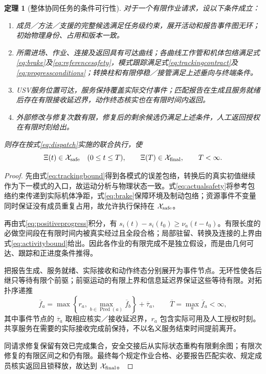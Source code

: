 \documentclass[UTF8,fontset=fandol,a4paper,11pt]{ctexart}
\newtheorem{theorem}{定理}
\newcommand{\Pred}{\operatorname{Pred}}
\begin{document}
\begin{theorem}[整体协同任务的条件可行性]
对于一个有限作业请求，设以下条件成立：
\begin{enumerate}[label=（\arabic*）]
 \item 成员／方法／支援的完整候选满足任务级约束，展开活动和报告事件图无环；初始物理身份、占用和版本一致。
 \item 所需进场、作业、连接及返回具有可达曲线；各曲线工作管和机体包络满足式\eqref{eq:brake}及\eqref{eq:referencesafety}，模式跟踪满足式\eqref{eq:trackingcontract}及\eqref{eq:progressconditions}；转换柱和有限停稳／接管满足上述垂向与终端条件。
 \item USV服务位置可达，服务保持覆盖实际交付事件；匹配报告在生成且服务就绪后存在有限接收延迟界，动作终态核实也在有限时间内返回。
 \item 外部修改与修复次数有限，修复后的剩余候选仍满足上述条件，人工返回授权在有限时刻给出。
\end{enumerate}
则存在按式\eqref{eq:dispatch}实施的联合执行，使
\begin{equation}
 \Xi(t)\in\mathcal X_{\rm safe}\quad(0\leq t\leq T),\qquad
 \Xi(T)\in\mathcal X_{\rm final},\qquad T<\infty.
 \label{eq:wholefeasibility}
\end{equation}
\end{theorem}
\begin{proof}
先由式\eqref{eq:trackingbound}得到各模式的误差包络，转换后的真实初值继续作为下一模式的入口，故运动分析与物理状态一致。式\eqref{eq:actualsafety}将参考包络约束传递到实际机体净距，式\eqref{eq:brake}保障环境及制动包络；资源事件不变量同时保证没有成员重复占用，故允许执行保持在 $\mathcal X_{\rm safe}$。

再由式\eqref{eq:positiveprogress}积分，有 $s_i(t)-s_i(t_0)\geq\nu_a(t-t_0)$。有限长度的必做空间段在有限时间内被真实经过且全段合格；局部驻留、转换及连接的上界由式\eqref{eq:activitybound}给出。因此各作业的有限完成不是独立假设，而是由几何可达、跟踪和正进度条件推得。

把报告生成、服务就绪、实际接收和动作终态分别展开为事件节点。无环性使各后继只等待有限个前驱；前驱运动的有限上界和信息延迟界保证这些等待有限。对拓扑序递推
\begin{equation}
 \overline f_a=
 \max\left\{r_a,\max_{b\in\Pred(a)}\overline f_b\right\}
          +\overline\tau_a,\qquad
 \overline T=\max_{a}\overline f_a<\infty,
 \label{eq:wholebound}
\end{equation}
其中事件节点的 $\overline\tau_a$ 取相应核实／接收延迟界，$r_a$ 包含实际可用及人工授权时刻。共享服务在需要的实际接收完成前保持，不以名义服务结束时间提前离开。

同请求修复保留有效已完成集合，安全交接后从实际状态重构有限剩余图；有限次修复的有限区间之和仍有限。最终每个规定作业合格、必要报告匹配实收、规定成员核实返回且锁释放，故达到 $\mathcal X_{\rm final}$。
\end{proof}
\end{document}
